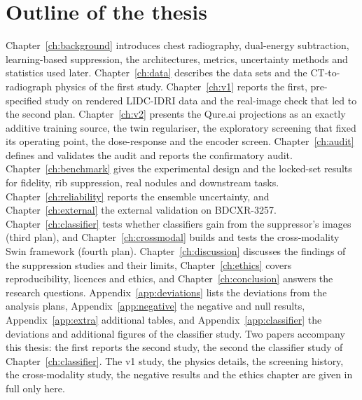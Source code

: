 \section{Outline of the thesis}
Chapter~\ref{ch:background} introduces chest radiography, dual-energy subtraction, learning-based suppression, the architectures, metrics,
uncertainty methods and statistics used later. Chapter~\ref{ch:data} describes the data sets and the CT-to-radiograph physics of the first
study. Chapter~\ref{ch:v1} reports the first, pre-specified study on rendered LIDC-IDRI data and the real-image check that led to the second
plan. Chapter~\ref{ch:v2} presents the Qure.ai projections as an exactly additive training source, the twin regulariser, the exploratory
screening that fixed its operating point, the dose-response and the encoder screen. Chapter~\ref{ch:audit} defines and validates the audit and
reports the confirmatory audit. Chapter~\ref{ch:benchmark} gives the experimental design and the locked-set results for fidelity, rib
suppression, real nodules and downstream tasks. Chapter~\ref{ch:reliability} reports the ensemble uncertainty, and Chapter~\ref{ch:external}
the external validation on BDCXR-3257. Chapter~\ref{ch:classifier} tests whether classifiers gain from the suppressor's images (third plan),
and Chapter~\ref{ch:crossmodal} builds and tests the cross-modality Swin framework (fourth plan). Chapter~\ref{ch:discussion} discusses the
findings of the suppression studies and their limits, Chapter~\ref{ch:ethics} covers reproducibility, licences and ethics, and
Chapter~\ref{ch:conclusion} answers the research questions. Appendix~\ref{app:deviations} lists the deviations from the analysis plans,
Appendix~\ref{app:negative} the negative and null results, Appendix~\ref{app:extra} additional tables, and Appendix~\ref{app:classifier}
the deviations and additional figures of the classifier study. Two papers accompany this thesis: the first reports the second study, the
second the classifier study of Chapter~\ref{ch:classifier}. The v1 study, the physics details, the screening history, the cross-modality
study, the negative results and the ethics chapter are given in full only here.

